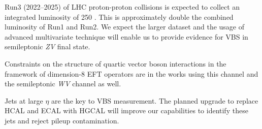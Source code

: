 Run3 (2022--2025) of \gls{LHC}
proton-proton collisions is expected to
collect an integrated luminosity of 250 \fbinv{}.
This is approximately double the combined luminosity of Run1 and Run2.
We expect the larger
dataset and the usage of advanced multivariate technique
will enable us to provide evidence for
\gls{VBS} in semileptonic \textit{ZV} final state.


Constraints on the structure of quartic vector boson interactions
in the framework of dimension-8 \gls{EFT} operators are in the works
using this channel and the semileptonic \textit{WV} channel as well.

Jets at large \( \eta \) are the key to \gls{VBS} measurement.
The planned upgrade to replace \gls{HCAL} and \gls{ECAL}
with \gls{HGCAL} will improve our capabilities to identify these jets and
reject pileup contamination.